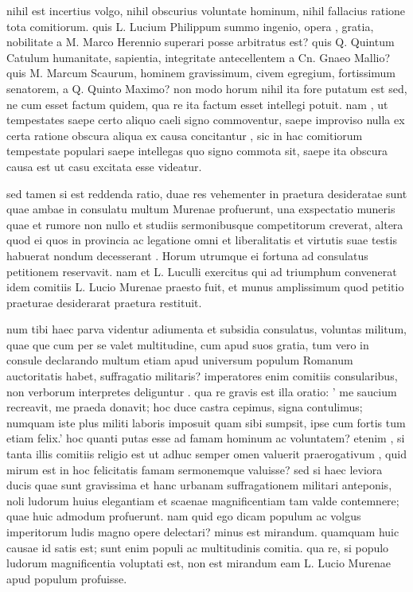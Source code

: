  nihil est incertius volgo, nihil obscurius voluntate hominum, nihil fallacius ratione tota comitiorum. quis L. Lucium Philippum summo ingenio, opera , gratia, nobilitate a M. Marco Herennio superari posse arbitratus est? quis Q. Quintum Catulum humanitate, sapientia, integritate antecellentem a Cn. Gnaeo Mallio? quis M. Marcum Scaurum, hominem gravissimum, civem egregium, fortissimum senatorem, a Q. Quinto Maximo? non modo horum nihil ita fore putatum est sed, ne cum esset factum quidem, qua re ita factum esset intellegi potuit. nam , ut tempestates saepe certo aliquo caeli signo commoventur, saepe improviso nulla ex certa ratione obscura aliqua ex causa concitantur , sic in hac comitiorum tempestate populari saepe intellegas quo signo commota sit, saepe ita obscura causa est ut casu excitata esse videatur.

 sed tamen si est reddenda ratio, duae res vehementer in praetura desideratae sunt quae ambae in consulatu multum Murenae profuerunt, una exspectatio muneris quae et rumore non nullo et studiis sermonibusque competitorum creverat, altera quod ei quos in provincia ac legatione omni et liberalitatis et virtutis suae testis habuerat nondum decesserant . Horum utrumque ei fortuna ad consulatus petitionem reservavit. nam et L. Luculli exercitus qui ad triumphum convenerat idem comitiis L. Lucio Murenae praesto fuit, et munus amplissimum quod petitio praeturae desiderarat praetura restituit.

 num tibi haec parva videntur adiumenta et subsidia consulatus, voluntas militum, quae que cum per se valet multitudine, cum apud suos gratia, tum vero in consule declarando multum etiam apud universum populum Romanum auctoritatis habet, suffragatio militaris? imperatores enim comitiis consularibus, non verborum interpretes deliguntur . qua re gravis est illa oratio: ' me saucium recreavit, me praeda donavit; hoc duce castra cepimus, signa contulimus; numquam iste plus militi laboris imposuit quam sibi sumpsit, ipse cum fortis tum etiam felix.' hoc quanti putas esse ad famam hominum ac voluntatem? etenim , si tanta illis comitiis religio est ut adhuc semper omen valuerit praerogativum , quid mirum est in hoc felicitatis famam sermonemque valuisse? sed si haec leviora ducis quae sunt gravissima et hanc urbanam suffragationem militari anteponis, noli ludorum huius elegantiam et scaenae magnificentiam tam valde contemnere; quae huic admodum profuerunt. nam quid ego dicam populum ac volgus imperitorum ludis magno opere delectari? minus est mirandum. quamquam huic causae id satis est; sunt enim populi ac multitudinis comitia. qua re, si populo ludorum magnificentia voluptati est, non est mirandum eam L. Lucio Murenae apud populum profuisse.

